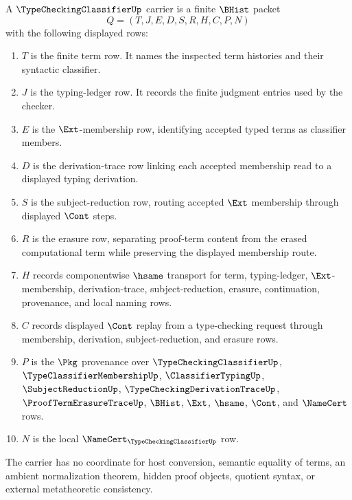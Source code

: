 \begin{definition}
\label{def:type-checking-classifier-carrier}
A $\TypeCheckingClassifierUp$ carrier is a finite $\BHist$ packet
$$
Q=(T,J,E,D,S,R,H,C,P,N)
$$
with the following displayed rows:
\begin{enumerate}
\item $T$ is the finite term row. It names the inspected term histories and their syntactic classifier.
\item $J$ is the typing-ledger row. It records the finite judgment entries used by the checker.
\item $E$ is the $\Ext$-membership row, identifying accepted typed terms as classifier members.
\item $D$ is the derivation-trace row linking each accepted membership read to a displayed typing derivation.
\item $S$ is the subject-reduction row, routing accepted $\Ext$ membership through displayed $\Cont$ steps.
\item $R$ is the erasure row, separating proof-term content from the erased computational term while preserving the displayed membership route.
\item $H$ records componentwise $\hsame$ transport for term, typing-ledger, $\Ext$-membership, derivation-trace, subject-reduction, erasure, continuation, provenance, and local naming rows.
\item $C$ records displayed $\Cont$ replay from a type-checking request through membership, derivation, subject-reduction, and erasure rows.
\item $P$ is the $\Pkg$ provenance over $\TypeCheckingClassifierUp$, $\TypeClassifierMembershipUp$, $\ClassifierTypingUp$, $\SubjectReductionUp$, $\TypeCheckingDerivationTraceUp$, $\ProofTermErasureTraceUp$, $\BHist$, $\Ext$, $\hsame$, $\Cont$, and $\NameCert$ rows.
\item $N$ is the local $\NameCert_{\TypeCheckingClassifierUp}$ row.
\end{enumerate}
The carrier has no coordinate for host conversion, semantic equality of terms, an ambient normalization theorem, hidden proof objects, quotient syntax, or external metatheoretic consistency.
\end{definition}

